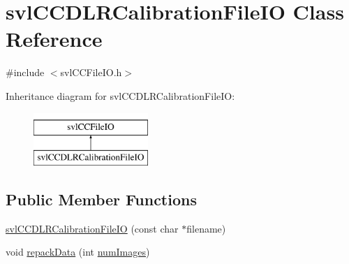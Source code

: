 \hypertarget{classsvl_c_c_d_l_r_calibration_file_i_o}{\section{svl\-C\-C\-D\-L\-R\-Calibration\-File\-I\-O Class Reference}
\label{classsvl_c_c_d_l_r_calibration_file_i_o}
}


{\ttfamily \#include $<$svl\-C\-C\-File\-I\-O.\-h$>$}

Inheritance diagram for svl\-C\-C\-D\-L\-R\-Calibration\-File\-I\-O\-:\begin{figure}[H]
\begin{center}
\leavevmode
\includegraphics[height=2.000000cm]{dc/d4d/classsvl_c_c_d_l_r_calibration_file_i_o}
\end{center}
\end{figure}
\subsection*{Public Member Functions}
\begin{DoxyCompactItemize}
\item 
\hyperlink{classsvl_c_c_d_l_r_calibration_file_i_o_ae2ce7aa7ab6d63b35267ac0dc4d736e7}{svl\-C\-C\-D\-L\-R\-Calibration\-File\-I\-O} (const char $\ast$filename)
\item 
void \hyperlink{classsvl_c_c_d_l_r_calibration_file_i_o_ad2903af380edfd676bb57b8c15698dc4}{repack\-Data} (int \hyperlink{classsvl_c_c_d_l_r_calibration_file_i_o_aea95d20c4c61996153cb1ca3732f7f00}{num\-Images})
\end{DoxyCompactItemize}
